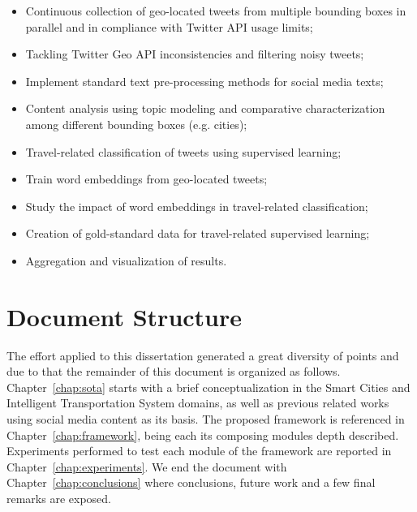 \begin{itemize}
	\item Continuous collection of geo-located tweets from multiple bounding boxes in parallel and in compliance with Twitter API usage limits;
	
	\item Tackling Twitter Geo API inconsistencies and filtering noisy tweets;
	
	\item Implement standard text pre-processing methods for social media texts;
	
	\item Content analysis using topic modeling and comparative characterization among different bounding boxes (e.g. cities);
	
	\item Travel-related classification of tweets using supervised learning;
	
	\item Train word embeddings from geo-located tweets;
	
	\item Study the impact of word embeddings in travel-related classification;
	
	\item Creation of gold-standard data for travel-related supervised learning;
	
	\item Aggregation and visualization of results.
\end{itemize}

\section{Document Structure}\label{sec:doc_structure}
The effort applied to this dissertation generated a great diversity of points and due to that the remainder of this document is organized as follows.
Chapter~\ref{chap:sota} starts with a brief conceptualization in the Smart Cities and Intelligent Transportation System domains, as well as previous related works using social media content as its basis.
The proposed framework is referenced in Chapter~\ref{chap:framework}, being each its composing modules depth described.
Experiments performed to test each module of the framework are reported in Chapter~\ref{chap:experiments}.
We end the document with Chapter~\ref{chap:conclusions} where conclusions, future work and a few final remarks are exposed.